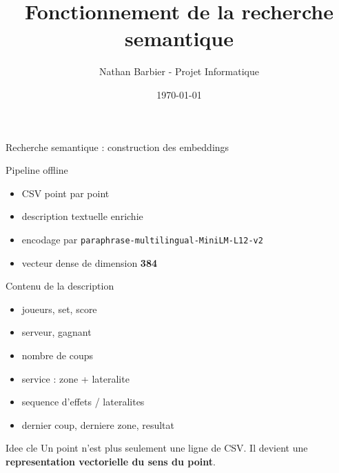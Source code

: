 \documentclass[aspectratio=169, 11pt]{beamer}
\title[Recherche semantique]{Fonctionnement de la recherche semantique}
\author{Nathan Barbier - Projet Informatique}
\date{\today}
\begin{document}
\begin{frame}{Recherche semantique : construction des embeddings}
    {\small
    \begin{block}{Pipeline offline}
        \begin{itemize}
            \item CSV point par point
            \item description textuelle enrichie
            \item encodage par \texttt{paraphrase-multilingual-MiniLM-L12-v2}
            \item vecteur dense de dimension \textbf{384}
        \end{itemize}
    \end{block}

    \begin{block}{Contenu de la description}
        \begin{itemize}
            \item joueurs, set, score
            \item serveur, gagnant
            \item nombre de coups
            \item service : zone + lateralite
            \item sequence d'effets / lateralites
            \item dernier coup, derniere zone, resultat
        \end{itemize}
    \end{block}
    
    \begin{alertblock}{Idee cle}
        Un point n'est plus seulement une ligne de CSV.
        Il devient une \textbf{representation vectorielle du sens du point}.
    \end{alertblock}
    }
\end{frame}
\end{document}
